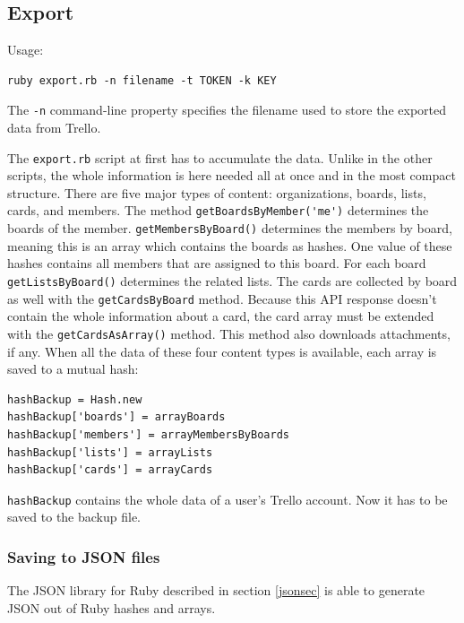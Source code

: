 \subsection{Export}
Usage:
\begin{lstlisting}[aboveskip=1\baselineskip, style=bash, caption=\texttt{export.rb} usage., label=listing037]
ruby export.rb -n filename -t TOKEN -k KEY
\end{lstlisting}

The \texttt{-n} command-line property specifies the filename used to store the exported data from Trello.

The \texttt{export.rb} script at first has to accumulate the data. Unlike in the other scripts, the whole information is here needed all at once and in the most compact structure. There are five major types of content: organizations, boards, lists, cards, and members. The method \lstinline{getBoardsByMember('me')} determines the boards of the member. \lstinline{getMembersByBoard()} determines the members by board, meaning this is an array which contains the boards as hashes. One value of these hashes contains all members that are assigned to this board. For each board \lstinline{getListsByBoard()} determines the related lists. The cards are collected by board as well with the \lstinline{getCardsByBoard} method. Because this API response doesn't contain the whole information about a card, the card array must be extended with the \lstinline{getCardsAsArray()} method. This method also downloads attachments, if any.  When all the data of these four content types is available, each array is saved to a mutual hash:

\begin{lstlisting}[aboveskip=1\baselineskip, caption=\texttt{joomlaMultiple.rb} usage., label=listing038]
hashBackup = Hash.new
hashBackup['boards'] = arrayBoards
hashBackup['members'] = arrayMembersByBoards
hashBackup['lists'] = arrayLists
hashBackup['cards'] = arrayCards
\end{lstlisting}

\lstinline{hashBackup} contains the whole data of a user's Trello account. Now it has to be saved to the backup file. 

\subsubsection{Saving to JSON files}
The JSON library for Ruby described in section \ref{jsonsec} is able to generate JSON out of Ruby hashes and arrays.

